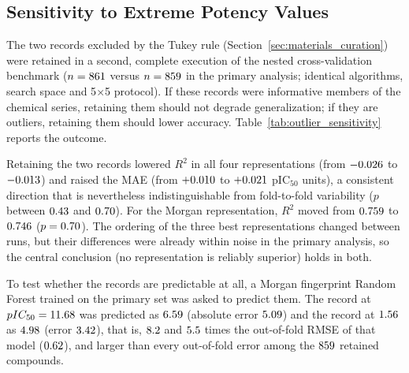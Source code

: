 \subsection{Sensitivity to Extreme Potency Values}
\label{sec:outlier_sensitivity}

The two records excluded by the Tukey rule (Section~\ref{sec:materials_curation}) were retained in a second, complete execution of the nested cross-validation benchmark ($n = \OutlierNSens$ versus $n = \OutlierNMain$ in the primary analysis; identical algorithms, search space and 5$\times$5 protocol). If these records were informative members of the chemical series, retaining them should not degrade generalization; if they are outliers, retaining them should lower accuracy. Table~\ref{tab:outlier_sensitivity} reports the outcome.

\begin{table}[htbp]
	\centering
	\caption{Nested cross-validation performance without (primary analysis, $n = \OutlierNMain$) and with ($n = \OutlierNSens$) the two extreme-potency records. $p$-values compare the two runs with a Welch test using the Nadeau-Bengio variance correction \cite{nadeau1999}; the runs use different fold partitions, so folds are not paired.}
	\label{tab:outlier_sensitivity}
	
\end{table}

Retaining the two records lowered $R^2$ in all four representations (from $-0.026$ to $-0.013$) and raised the MAE (from $+0.010$ to $+0.021$ pIC$_{50}$ units), a consistent direction that is nevertheless indistinguishable from fold-to-fold variability ($p$ between $0.43$ and $0.70$). For the Morgan representation, $R^2$ moved from $0.759$ to $0.746$ ($p = 0.70$). The ordering of the three best representations changed between runs, but their differences were already within noise in the primary analysis, so the central conclusion (no representation is reliably superior) holds in both.

To test whether the records are predictable at all, a Morgan fingerprint Random Forest trained on the primary set was asked to predict them. The record at $pIC_{50} = 11.68$ was predicted as $6.59$ (absolute error $5.09$) and the record at $1.56$ as $4.98$ (error $3.42$), that is, $8.2$ and $5.5$ times the out-of-fold RMSE of that model ($0.62$), and larger than every out-of-fold error among the $859$ retained compounds.

